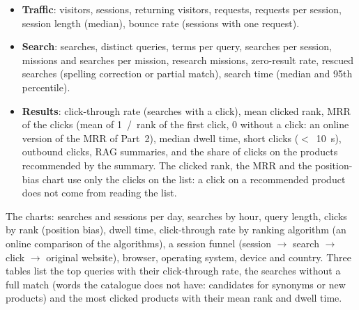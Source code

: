 \documentclass[11pt,a4paper]{article}
\begin{document}
\begin{itemize}
\item \textbf{Traffic}: visitors, sessions, returning visitors, requests, requests per session, session length (median),
bounce rate (sessions with one request).
\item \textbf{Search}: searches, distinct queries, terms per query, searches per session, missions and searches per
mission, research missions, zero-result rate, rescued searches (spelling correction or partial match), search time
(median and 95th percentile).
\item \textbf{Results}: click-through rate (searches with a click), mean clicked rank, MRR of the clicks (mean of
1~/~rank of the first click, 0 without a click: an online version of the MRR of Part~2), median dwell time, short clicks
($<$~10~s), outbound clicks, RAG summaries, and the share of clicks on the products recommended by the summary. The
clicked rank, the MRR and the position-bias chart use only the clicks on the list: a click on a recommended product
does not come from reading the list.
\end{itemize}

The charts: searches and sessions per day, searches by hour, query length, clicks by rank (position bias), dwell
time, click-through rate by ranking algorithm (an online comparison of the algorithms), a session funnel (session
$\to$ search $\to$ click $\to$ original website), browser, operating system, device and country. Three tables list the
top queries with their click-through rate, the searches without a full match (words the catalogue does not have:
candidates for synonyms or new products) and the most clicked products with their mean rank and dwell time.
\end{document}
